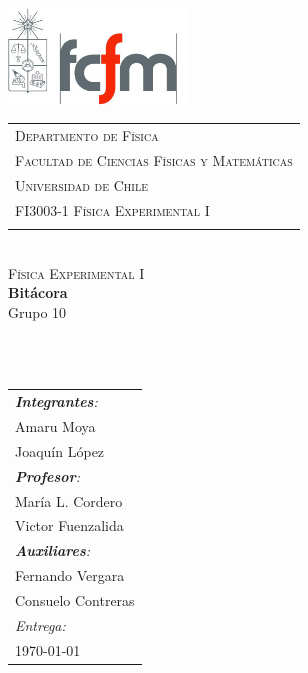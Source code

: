 \begin{titlepage}


\includegraphics[width=4.7cm]{logo.png} 
	\hspace{0cm}
\begin{tabular}{l}
\textsc{\color{red}Departmento de Física}\\
\textsc{\color{gray51}Facultad de Ciencias Físicas y Matemáticas}\\
\textsc{\color{gray51}Universidad de Chile}\\
\textsc{\color{gray51}FI3003-1 Física Experimental I}\\
  \vspace*{1.1cm}\mbox{}
  \end{tabular}
\vspace*{2.5 cm}
  
\begin{center}
~\\[0.5cm]
{\color{gray71}\textsc{Física Experimental I}}
\HRule~ \\[0.4cm]
{ \Huge \textup \bfseries  Bitácora}\\[0.4cm]
{ \Large \textup{Grupo 10 }}\\[0.2cm]
\HRule ~\\[1cm]
\end{center}
\begin{minipage}{.5\textwidth}
~
\end{minipage}
\begin{minipage}{.5\textwidth}
\begin{flushright}
\vspace{.5cm}%
\begin{tabular}{l}

\emph{\textbf{Integrantes}:}\\
{\small Amaru Moya}\\[.2cm]
{\small Joaquín López}\\[.2cm]


\emph{\textbf{Profesor}:} \\ 
{\small María L. Cordero}\\[0.2 cm]
{\small Victor Fuenzalida }\\[0.2 cm]

\emph{\textbf{Auxiliares}:} \\
{\small	Fernando Vergara}\\[0.2cm]
{\small	Consuelo Contreras}\\[0.2cm]

\emph{Entrega:}\\
{\small \today}
\end{tabular}
\end{flushright}
\end{minipage}
\end{titlepage}



%